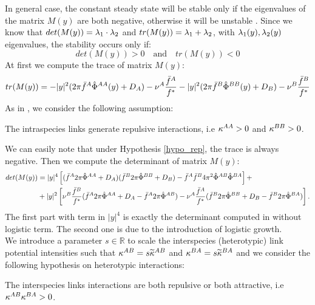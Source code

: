 In general case, the constant steady state will be stable only if the eigenvalues of the matrix $M(y)$ are both negative, otherwise it will be unstable . Since we know that $det(M(y))={\lambda}_1 \cdot {\lambda}_2$ and $tr(M(y))={\lambda}_1+{\lambda}_2$, with ${\lambda}_1(y), {\lambda}_2(y)$ eigenvalues, the stability occurs only if:
\[det(M(y))>0\quad \text{and} \quad tr(M(y))<0\]
At first we compute the trace of matrix $M(y)$:
\begin{equation}
 tr(M(y))=-|y|^2(2\pi{\bar{f}^A}{\hat{\Phi}^{AA}}(y)+D_A)-{\nu^A}\frac{{\bar{f}^A}}{{f^{*}}}-|y|^2(2\pi{\bar{f}^B}{\hat{\Phi}^{BB}}(y)+D_B)-{\nu^B}\frac{{\bar{f}^B}}{{f^{*}}}
\end{equation}
As in \cite{twoparticule}, we consider the following assumption:
\begin{hypo}\label{hypo_rep}
 The intraspecies links generate repulsive interactions, i.e ${\kappa^{AA}}>0$ and ${\kappa^{BB}}>0$.
\end{hypo}
We can easily note that under Hypothesis \ref{hypo_rep}, the trace is always negative.
Then we compute the determinant of matrix $M(y)$:
\begin{equation}
\begin{split}
det(M(y))&= |y|^4 \left[ ({\bar{f}^A} 2\pi {\hat{\Phi}^{AA}} +D_A)({\bar{f}^B} 2\pi {\hat{\Phi}^{BB}} +D_B) - {\bar{f}^A} {\bar{f}^B} 4 \pi^2 {\hat{\Phi}^{AB}} {\hat{\Phi}^{BA}} \right] + \\
&+|y|^2 \left[ {\nu^B} \frac{{\bar{f}^B}}{{f^{*}}}({\bar{f}^A} 2\pi {\hat{\Phi}^{AA}} + D_A -{\bar{f}^A} 2\pi {\hat{\Phi}^{AB}}) - {\nu^A} \frac{{\bar{f}^A}}{{f^{*}}}({\bar{f}^B} 2\pi {\hat{\Phi}^{BB}} + D_B -{\bar{f}^B} 2\pi {\hat{\Phi}^{BA}})   \right].
\end{split}
\end{equation}
The first part with term in $|y|^4$ is exactly the determinant computed in \cite{twoparticule} without logistic term. The second one is due to the introduction of logistic growth. \\
 We introduce a parameter $s \in \mathbb{R}$ to scale the interspecies (heterotypic) link potential intensities such that ${\kappa^{AB}}=s {\widetilde{\kappa}^{AB}} $ and ${\kappa^{BA}}=s {\widetilde{\kappa}^{BA}} $ and we consider the following hypothesis on heterotypic interactions: 
\begin{hypo}\label{hypo_rep2}
 The interspecies links interactions are both repulsive or both attractive, i.e ${\kappa^{AB}}{\kappa^{BA}}>0$. 
\end{hypo}
